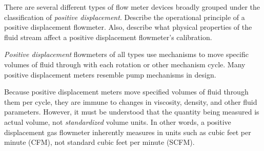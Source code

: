 

There are several different types of flow meter devices broadly grouped under the classification of {\it positive displacement}.  Describe the operational principle of a positive displacement flowmeter.  Also, describe what physical properties of the fluid stream affect a positive displacement flowmeter's calibration.







{\it Positive displacement} flowmeters of all types use mechanisms to move specific volumes of fluid through with each rotation or other mechanism cycle.  Many positive displacement meters resemble pump mechanisms in design.

Because positive displacement meters move specified volumes of fluid through them per cycle, they are immune to changes in viscosity, density, and other fluid parameters.  However, it must be understood that the quantity being measured is actual volume, not {\it standardized} volume units.  In other words, a positive displacement gas flowmeter inherently measures in units such as cubic feet per minute (CFM), not standard cubic feet per minute (SCFM).











